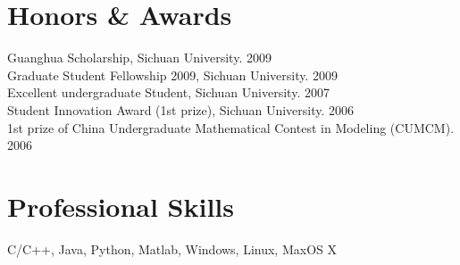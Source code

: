 \documentclass[line,margin]{res}
\begin{document}
\begin{resume}
 
\section{\sc Honors \& Awards}
\smallskip


Guanghua Scholarship, Sichuan University.  \hfill       2009 \\
Graduate Student Fellowship 2009, Sichuan University.  \hfill       2009 \\
Excellent undergraduate Student, Sichuan University.  \hfill       2007\\
Student Innovation Award (1st prize), Sichuan University.  \hfill       2006 \\
1st prize of China Undergraduate Mathematical Contest in Modeling (CUMCM).  \hfill       2006

\section{\sc Professional Skills}
\smallskip

C/C++, Java, Python, Matlab, Windows, Linux, MaxOS X

\end{resume}

%
%
\end{document}
